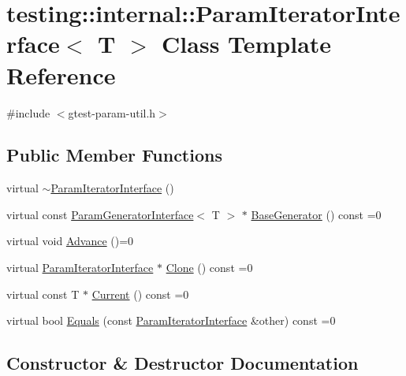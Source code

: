 \hypertarget{classtesting_1_1internal_1_1ParamIteratorInterface}{}\section{testing\+::internal\+::Param\+Iterator\+Interface$<$ T $>$ Class Template Reference}
\label{classtesting_1_1internal_1_1ParamIteratorInterface}


{\ttfamily \#include $<$gtest-\/param-\/util.\+h$>$}

\subsection*{Public Member Functions}
\begin{DoxyCompactItemize}
\item 
virtual \mbox{\hyperlink{classtesting_1_1internal_1_1ParamIteratorInterface_adf6ba49e6b54a6e3b15dbd5733988bef}{$\sim$\+Param\+Iterator\+Interface}} ()
\item 
virtual const \mbox{\hyperlink{classtesting_1_1internal_1_1ParamGeneratorInterface}{Param\+Generator\+Interface}}$<$ T $>$ $\ast$ \mbox{\hyperlink{classtesting_1_1internal_1_1ParamIteratorInterface_a17500953df75ecda1ace46c08ff731e9}{Base\+Generator}} () const =0
\item 
virtual void \mbox{\hyperlink{classtesting_1_1internal_1_1ParamIteratorInterface_a600dbd35fcb551463e379516a1abea48}{Advance}} ()=0
\item 
virtual \mbox{\hyperlink{classtesting_1_1internal_1_1ParamIteratorInterface}{Param\+Iterator\+Interface}} $\ast$ \mbox{\hyperlink{classtesting_1_1internal_1_1ParamIteratorInterface_a4998c23e27e2943d97546011aa35db80}{Clone}} () const =0
\item 
virtual const T $\ast$ \mbox{\hyperlink{classtesting_1_1internal_1_1ParamIteratorInterface_adfff808576d929085679c315b255af7e}{Current}} () const =0
\item 
virtual bool \mbox{\hyperlink{classtesting_1_1internal_1_1ParamIteratorInterface_a9d811697a752d46f7bd6a0082f9040a3}{Equals}} (const \mbox{\hyperlink{classtesting_1_1internal_1_1ParamIteratorInterface}{Param\+Iterator\+Interface}} \&other) const =0
\end{DoxyCompactItemize}


\subsection{Constructor \& Destructor Documentation}
\mbox{\label{classtesting_1_1internal_1_1ParamIteratorInterface_adf6ba49e6b54a6e3b15dbd5733988bef}} 
